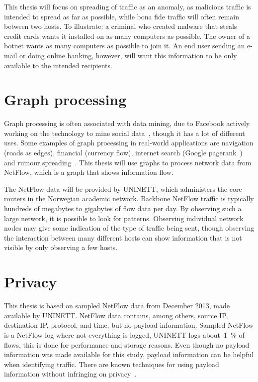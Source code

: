 This thesis will focus on spreading of traffic as an anomaly, as malicious traffic is intended to spread as far as possible,
 while bona fide traffic will often remain between two hosts.
To illustrate: a criminal who created malware that steals credit cards wants it installed on as many computers as possible.
The owner of a botnet wants as many computers as possible to join it.
An end user sending an e-mail or doing online banking, however, will want this information to be only available to the intended recipients.


\section{Graph processing}
Graph processing is often associated with data mining, due to Facebook actively working on the technology to mine social data~\cite{ching2013scaling},
 though it has a lot of different uses.
Some examples of graph processing in real-world applications are navigation (roads as edges), financial (currency flow), internet search (Google pagerank~\cite{page1999pagerank}) and rumour spreading~\cite{nekovee2007theory}.
This thesis will use graphs to process network data from NetFlow, which is a graph that shows information flow.

The NetFlow data will be provided by UNINETT, which administers the core routers in the Norwegian academic network.
Backbone NetFlow traffic is typically hundreds of megabytes to gigabytes of flow data per day.
By observing such a large network, it is possible to look for patterns.
Observing individual network nodes may give some indication of the type of traffic being sent,
 though observing the interaction between many different hosts can show information that is not visible by only observing a few hosts.


\section{Privacy}
This thesis is based on sampled NetFlow data from December 2013, made available by UNINETT.
NetFlow data contains, among others, source IP, destination IP, protocol, and time, but no payload information.
Sampled NetFlow is a NetFlow log where not everything is logged, UNINETT logs about~1~\% of flows, this is done for performance and storage reasons.
Even though no payload information was made available for this study, payload information can be helpful when identifying traffic.
There are known techniques for using payload information without infringing on privacy~\cite{parekh2006privacy}.


